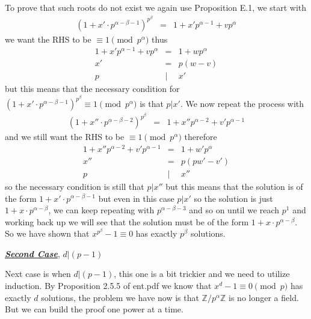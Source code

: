 \documentclass[aps,preprint,preprintnumbers,nofootinbib,showpacs,prd]{revtex4-1}
\newcommand{\nbea}{\begin{eqnarray*}}
\newcommand{\neea}{\end{eqnarray*}}
\begin{document}
To prove that such roots do not exist we again use Proposition E.1, we start with
%
\nbea
(1 + x'\cdot p^{\alpha-\beta-1})^{p^\beta} & = & 1 + x'p^{\alpha - 1} + v p^{\alpha}
\neea
%
we want the RHS to be $\equiv 1 \pmod{p^\alpha}$ thus
%
\nbea
1 + x'p^{\alpha - 1} + v p^{\alpha} & = & 1 + w p^\alpha \\
x' & = & p(w - v) \\
p & | & x'
\neea
%
but this means that the necessary condition for $(1 + x'\cdot p^{\alpha-\beta-1})^{p^\beta} \equiv 1 \pmod{p^\alpha}$ is that $p | x'$. We now repeat the process with 
%
\nbea
(1 + x''\cdot p^{\alpha-\beta-2})^{p^\beta} & = & 1 + x''p^{\alpha - 2} + v' p^{\alpha-1}
\neea
%
and we still want the RHS to be $\equiv 1 \pmod{p^\alpha}$ therefore
%
\nbea
1 + x''p^{\alpha - 2} + v' p^{\alpha-1} & = & 1 + w' p^\alpha \\
x'' & = & p(pw' - v') \\
p & | & x''
\neea
%
so the necessary condition is still that $p|x''$ but this means that the solution is of the form $1 + x'\cdot p^{\alpha-\beta-1}$ but even in this case $p|x'$ so the solution is just $1 + x\cdot p^{\alpha-\beta}$, we can keep repeating with $p^{\alpha-\beta-3}$ and so on until we reach $p^{1}$ and working back up we will see that the solution must be of the form $1 + x\cdot p^{\alpha-\beta}$. So we have shown that $x^{p^\beta} - 1 \equiv 0$ has exactly $p^\beta$ solutions.

\bigskip
\underline{\textbf{\textit{Second Case}}}, $d|(p-1)$
\bigskip

Next case is when $d|(p-1)$, this one is a bit trickier and we need to utilize induction. By Proposition 2.5.5 of ent.pdf we know that $x^d - 1\equiv 0 \pmod{p}$ has exactly $d$ solutions, the problem we have now is that $\mathbb{Z}/p^\alpha\mathbb{Z}$ is no longer a field. But we can build the proof one power at a time.
\end{document}

